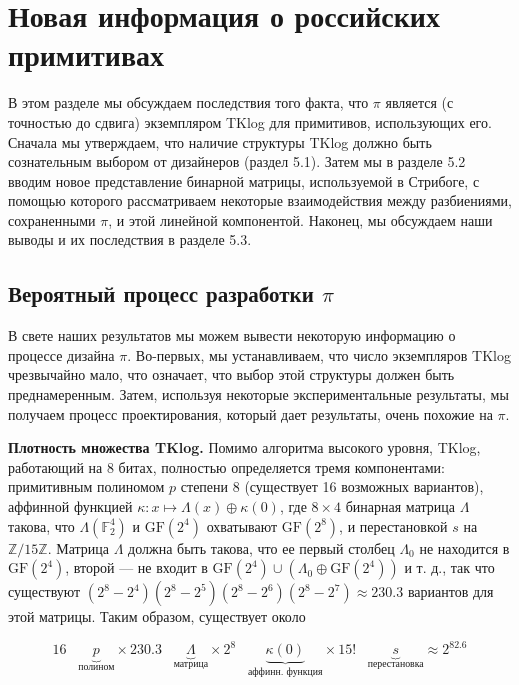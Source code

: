 \section{Новая информация о российских примитивах}

В этом разделе мы обсуждаем последствия того факта, что \(\pi\) является (с точностью до сдвига)
экземпляром TKlog для примитивов, использующих его. Сначала мы утверждаем, что наличие
структуры TKlog должно быть сознательным выбором от дизайнеров (раздел 5.1). Затем мы
в разделе 5.2 вводим новое представление бинарной матрицы, используемой в Стрибоге, с
помощью которого рассматриваем некоторые взаимодействия между разбиениями, сохраненными
\(\pi\), и этой линейной компонентой. Наконец, мы обсуждаем наши выводы и их последствия в разделе 5.3.

\subsection{Вероятный процесс разработки \(\pi\)}

В свете наших результатов мы можем вывести некоторую информацию о процессе дизайна
\(\pi\). Во-первых, мы устанавливаем, что число экземпляров TKlog чрезвычайно мало, что
означает, что выбор этой структуры должен быть преднамеренным. Затем, используя некоторые
экспериментальные результаты, мы получаем процесс проектирования, который дает результаты,
очень похожие на \(\pi\).

\textbf{Плотность множества TKlog.} Помимо алгоритма высокого уровня, TKlog, работающий
на 8 битах, полностью определяется тремя компонентами: примитивным полиномом \(p\)
степени 8 (существует 16 возможных вариантов), аффинной функцией \(\kappa : x \mapsto
\Lambda(x) \oplus \kappa(0)\), где \(8 \times 4\) бинарная матрица \(\Lambda\) такова, что
\(\Lambda(\mathbb{F}_{2}^{4})\) и \(\text{GF}(2^4)\) охватывают \(\text{GF}(2^8)\), и
перестановкой \(s\) на \(\mathbb{Z}/15\mathbb{Z}\). Матрица \(\Lambda\) должна быть такова,
что ее первый столбец \(\Lambda_0\) не находится в \(\text{GF}(2^4)\), второй — не входит
в \(\text{GF}(2^4) \cup (\Lambda_0 \oplus \text{GF}(2^4))\) и т. д., так что существуют
\((2^8 - 2^4)(2^8 - 2^5)(2^8 - 2^6)(2^8 - 2^7) \approx 230.3\) вариантов для этой матрицы.
Таким образом, существует около

\[
16 \hspace{10pt} \underbrace{p}_{\text{полином}} \times 230.3 \hspace{10pt} \underbrace{\Lambda}_\text{матрица} \times 2^8 \hspace{10pt} \underbrace{\kappa(0)}_\text{аффинн. функция} \times 15! \hspace{10pt} \underbrace{s}_\text{перестановка} \approx 2^{82.6}
\]

